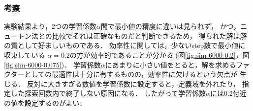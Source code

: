 \subsubsection{考察}

実験結果より，2つの学習係数$\alpha$間で最小値の精度に違いは見られず，
かつ，ニュートン法との比較でそれは正確なものだと判断できるため，
得られた解は解の質として好ましいものである．
効率性に関しては，少ないstep数で最小値に収束している
$\alpha=0.2$の方が効率的であることが分かる
(図\ref{fig:sim-6000-0.2}，図\ref{fig:sim-6000-0.075})．
学習係数$\alpha$にあまりに小さい値をとると，解を求めるファクターとしての最適性は十分に有するものの，効率性に欠けるという欠点が
生じる．
反対に大きすぎる数値を学習係数に設定すると，定義域を外れたり，
指定した探索回数内で終了しない原因になる．
したがって学習係数$\alpha$には0.2付近の値を設定するのがよい．


